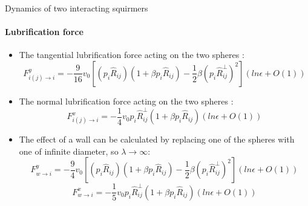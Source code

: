 \documentclass{beamer}
\begin{document}
\begin{frame}{Dynamics of two interacting squirmers}
    \framesubtitle{Lubrification force}
    \begin{itemize}
        \item The tangential lubrification force acting on the two spheres : \begin{equation*}
            \boxed{
F_{i(j)\rightarrow i}^{y} = -\frac{9}{16}v_0
\left[(p_i\hat{R}_{ij})(1 + \beta p_i\hat{R}_{ij}) - \frac{1}{2}\beta(p_i\hat{R}^{\perp}_{ij})^2\right](ln \epsilon + O(1))
}
\end{equation*}
    \item The normal lubrification force acting on the two spheres :
    \begin{equation*}
\boxed{F_{i(j)\rightarrow i}^{x} = -\frac{1}{4}v_0p_i\hat{R}^{\perp}_{ij}(1 + \beta p_i\hat{R}_{ij})(ln \epsilon + O(1))}
\end{equation*}
    \item The effect of a wall can be calculated by replacing one of the spheres with one of infinite diameter, so $\lambda\rightarrow\infty$:
    \begin{equation*}
        \boxed{F_{w\rightarrow i}^{y} = -\frac{9}{4} v_0
        \left[(p_i\hat{R}_{ij})(1 + \beta p_i\hat{R}_{ij}) - \frac{1}{2}\beta(p_i\hat{R}^{\perp}_{ij})^2\right](ln \epsilon + O(1))}
    \end{equation*}
    \begin{equation*}
        \boxed{F_{w\rightarrow i}^{x} = -\frac{1}{5} v_0p_i\hat{R}^{\perp}_{ij}(1 + \beta p_i\hat{R}_{ij})(ln \epsilon + O(1))}
    \end{equation*}
    \end{itemize}
\end{frame}
    
\end{document}
